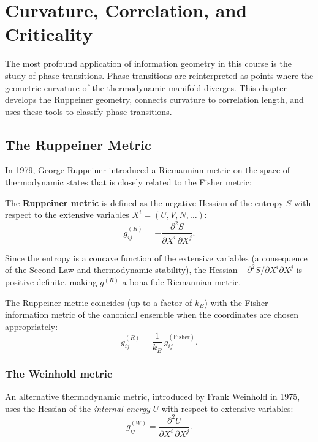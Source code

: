 \chapter{Curvature, Correlation, and Criticality}

The most profound application of information geometry in this course is the study of phase transitions. Phase transitions are reinterpreted as points where the geometric curvature of the thermodynamic manifold diverges. This chapter develops the Ruppeiner geometry, connects curvature to correlation length, and uses these tools to classify phase transitions.

\section{The Ruppeiner Metric}

In 1979, George Ruppeiner introduced a Riemannian metric on the space of thermodynamic states that is closely related to the Fisher metric:

\begin{definition}
The \textbf{Ruppeiner metric} is defined as the negative Hessian of the entropy $S$ with respect to the extensive variables $X^i = (U, V, N, \ldots)$:
\begin{equation}
g_{ij}^{(R)} = -\frac{\partial^2 S}{\partial X^i\,\partial X^j}.
\end{equation}
\end{definition}

Since the entropy is a concave function of the extensive variables (a consequence of the Second Law and thermodynamic stability), the Hessian $-\partial^2 S / \partial X^i\partial X^j$ is positive-definite, making $g^{(R)}$ a bona fide Riemannian metric.

\begin{proposition}
The Ruppeiner metric coincides (up to a factor of $k_B$) with the Fisher information metric of the canonical ensemble when the coordinates are chosen appropriately:
\begin{equation}
g_{ij}^{(R)} = \frac{1}{k_B}\,g_{ij}^{(\text{Fisher})}.
\end{equation}
\end{proposition}

\subsection{The Weinhold metric}

An alternative thermodynamic metric, introduced by Frank Weinhold in 1975, uses the Hessian of the \emph{internal energy} $U$ with respect to extensive variables:
\begin{equation}
g_{ij}^{(W)} = \frac{\partial^2 U}{\partial X^i\,\partial X^j}.
\end{equation}

